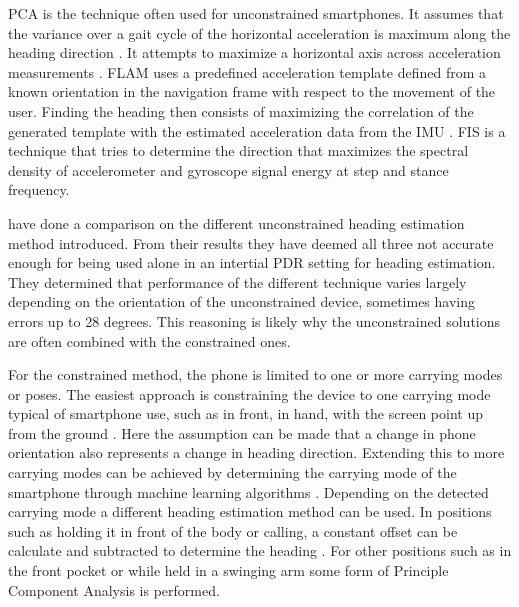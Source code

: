 PCA is the technique often used for unconstrained smartphones. It assumes that the variance over a gait cycle of the horizontal acceleration is maximum along the heading direction \cite{Combettes2017}. It attempts to maximize a horizontal axis across acceleration measurements . FLAM uses a predefined acceleration template defined from a known orientation in the navigation frame with respect to the movement of the user. Finding the heading then consists of maximizing the correlation of the generated template with the estimated acceleration data from the IMU \cite{Combettes2017}. FIS is a technique that tries to determine the direction that maximizes the spectral density of accelerometer and gyroscope signal energy at step and stance frequency. 

\citet{Combettes2015} have done a comparison on the different unconstrained heading estimation method introduced. From their results they have deemed all three not accurate enough for being used alone in an intertial \ac{PDR} setting for heading estimation. They determined that performance of the different technique varies largely depending on the orientation of the unconstrained device, sometimes having errors up to 28 degrees. This reasoning is likely why the unconstrained solutions are often combined with the constrained ones.

For the constrained method, the phone is limited to one or more carrying modes or poses. The easiest approach is constraining the device to one carrying mode typical of smartphone use, such as in front, in hand, with the screen point up from the ground \cite{Deng2016}. Here the assumption can be made that a change in phone orientation also represents a change in heading direction. Extending this to more carrying modes can be achieved by determining the carrying mode of the smartphone through machine learning algorithms \cite{Lee2019, Sun2015a}. Depending on the detected carrying mode a different heading estimation method can be used. In positions such as holding it in front of the body or calling, a constant offset can be calculate and subtracted to determine the heading \cite{Sun2015a}. For other positions such as in the front pocket or while held in a swinging arm some form of Principle Component Analysis \cite{Deng2016,Lee2019,Sun2015} is performed.\par



